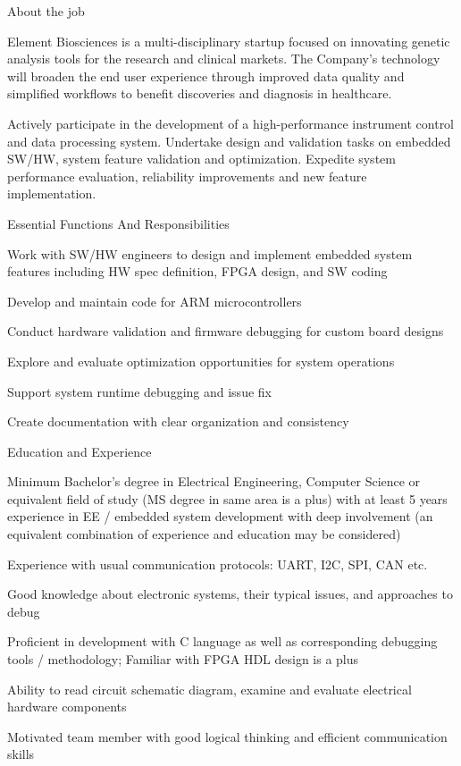 \par About the job
\par Element Biosciences is a multi-disciplinary startup focused on innovating genetic analysis tools for the research and clinical markets. The Company's technology will broaden the end user experience through improved data quality and simplified workflows to benefit discoveries and diagnosis in healthcare.
\par Actively participate in the development of a high-performance instrument control and data processing system. Undertake design and validation tasks on embedded SW/HW, system feature validation and optimization. Expedite system performance evaluation, reliability improvements and new feature implementation.
\par Essential Functions And Responsibilities
\par Work with SW/HW engineers to design and implement embedded system features including HW spec definition, FPGA design, and SW coding
\par Develop and maintain code for ARM microcontrollers
\par Conduct hardware validation and firmware debugging for custom board designs
\par Explore and evaluate optimization opportunities for system operations
\par Support system runtime debugging and issue fix
\par Create documentation with clear organization and consistency
\par Education and Experience
\par Minimum Bachelor’s degree in Electrical Engineering, Computer Science or equivalent field of study (MS degree in same area is a plus) with at least 5 years experience in EE / embedded system development with deep involvement (an equivalent combination of experience and education may be considered)
\par Experience with usual communication protocols: UART, I2C, SPI, CAN etc.
\par Good knowledge about electronic systems, their typical issues, and approaches to debug
\par Proficient in development with C language as well as corresponding debugging tools / methodology; Familiar with FPGA HDL design is a plus
\par Ability to read circuit schematic diagram, examine and evaluate electrical hardware components
\par Motivated team member with good logical thinking and efficient communication skills
